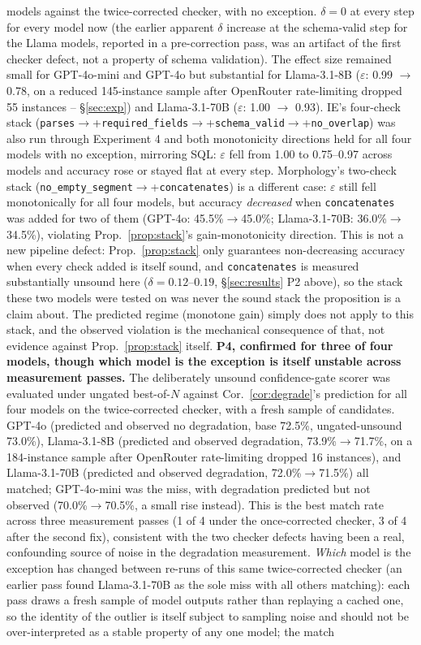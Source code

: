 \documentclass[11pt]{article}
\begin{document}
models against the twice-corrected checker, with no exception. $\delta=0$ at every step for every model now (the earlier apparent $\delta$ increase at the schema-valid step for the Llama models, reported in a pre-correction pass, was an artifact of the first checker defect, not a property of schema validation). The effect size remained small for GPT-4o-mini and GPT-4o but substantial for Llama-3.1-8B ($\varepsilon$: 0.99 $\to$ 0.78, on a reduced 145-instance sample after OpenRouter rate-limiting dropped 55 instances -- \S\ref{sec:exp}) and Llama-3.1-70B ($\varepsilon$: 1.00 $\to$ 0.93). IE's four-check stack (\texttt{parses}$\to$+\texttt{required\_fields}$\to$+\texttt{schema\_valid}$\to$+\texttt{no\_overlap}) was also run through Experiment 4 and both monotonicity directions held for all four models with no exception, mirroring SQL: $\varepsilon$ fell from 1.00 to 0.75--0.97 across models and accuracy rose or stayed flat at every step. Morphology's two-check stack (\texttt{no\_empty\_segment}$\to$+\texttt{concatenates}) is a different case: $\varepsilon$ still fell monotonically for all four models, but accuracy \emph{decreased} when \texttt{concatenates} was added for two of them (GPT-4o: 45.5\%$\to$45.0\%; Llama-3.1-70B: 36.0\%$\to$34.5\%), violating Prop.~\ref{prop:stack}'s gain-monotonicity direction. This is not a new pipeline defect: Prop.~\ref{prop:stack} only guarantees non-decreasing accuracy when every check added is itself sound, and \texttt{concatenates} is measured substantially unsound here ($\delta=0.12$--$0.19$, \S\ref{sec:results} P2 above), so the stack these two models were tested on was never the sound stack the proposition is a claim about. The predicted regime (monotone gain) simply does not apply to this stack, and the observed violation is the mechanical consequence of that, not evidence against Prop.~\ref{prop:stack} itself. \textbf{P4, confirmed for three of four models, though which model is the exception is itself unstable across measurement passes.} The deliberately unsound confidence-gate scorer was evaluated under ungated best-of-$N$ against Cor.~\ref{cor:degrade}'s prediction for all four models on the twice-corrected checker, with a fresh sample of candidates. GPT-4o (predicted and observed no degradation, base 72.5\%, ungated-unsound 73.0\%), Llama-3.1-8B (predicted and observed degradation, 73.9\%$\to$71.7\%, on a 184-instance sample after OpenRouter rate-limiting dropped 16 instances), and Llama-3.1-70B (predicted and observed degradation, 72.0\%$\to$71.5\%) all matched; GPT-4o-mini was the miss, with degradation predicted but not observed (70.0\%$\to$70.5\%, a small rise instead). This is the best match rate across three measurement passes (1 of 4 under the once-corrected checker, 3 of 4 after the second fix), consistent with the two checker defects having been a real, confounding source of noise in the degradation measurement. \emph{Which} model is the exception has changed between re-runs of this same twice-corrected checker (an earlier pass found Llama-3.1-70B as the sole miss with all others matching): each pass draws a fresh sample of model outputs rather than replaying a cached one, so the identity of the outlier is itself subject to sampling noise and should not be over-interpreted as a stable property of any one model; the match 
\end{document}
